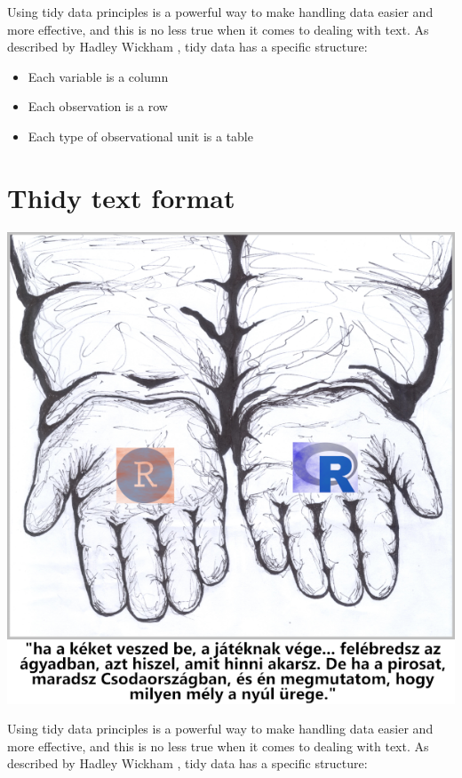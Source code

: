 \documentclass[
]{book}
\providecommand{\tightlist}{%
  \setlength{\itemsep}{0pt}\setlength{\parskip}{0pt}}
\begin{document}
Using tidy data principles is a powerful way to make handling data easier and more effective, and this is no less true when it comes to dealing with text. As described by Hadley Wickham \citep{tidydata}, tidy data has a specific structure:

\begin{itemize}
\tightlist
\item
  Each variable is a column
\item
  Each observation is a row
\item
  Each type of observational unit is a table
\end{itemize}

\hypertarget{tidynnddddtext}{%
\chapter{Thidy text format}\label{tidynnddddtext}}

\begin{center}\includegraphics[width=0.9\linewidth]{images/ch_03_small} \end{center}

Using tidy data principles is a powerful way to make handling data easier and more effective, and this is no less true when it comes to dealing with text. As described by Hadley Wickham \citep{tidydata}, tidy data has a specific structure:
\end{document}
